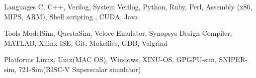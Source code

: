 \par\addvspace{-1ex}


\begin{cvskills}

  \cvskill
    {Languages} %
    {\color{black}C, C++, Verilog, System Verilog, Python, Ruby, Perl, Assembly (x86, MIPS, ARM), Shell scripting , CUDA, Java} %

  \cvskill
    {Tools} %
    {ModelSim, QuestaSim, Veloce Emulator, Synopsys Design Compiler, MATLAB, Xilinx ISE, Git, Makefiles, GDB, Valgrind} %

    \cvskill
    {Platforms} %
    {Linux, Unix(MAC OS), Windows, XINU-OS, GPGPU-sim, SNIPER-sim, 721-Sim(RISC-V Superscalar simulator)} %




  

\end{cvskills}
